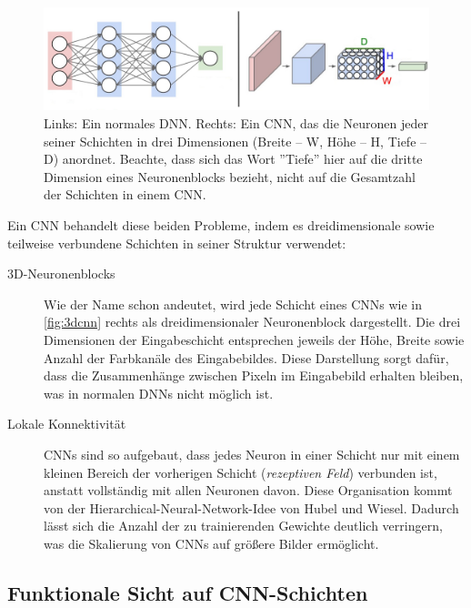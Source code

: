 \begin{figure}[!ht]
	\centering
	\includegraphics[width=\linewidth]{images/3DCNN}
	\caption{Links: Ein normales DNN. Rechts: Ein CNN, das die Neuronen jeder seiner Schichten in drei Dimensionen (Breite – W, Höhe – H, Tiefe – D) anordnet. Beachte, dass sich das Wort ''Tiefe'' hier auf die dritte Dimension eines Neuronenblocks bezieht, nicht auf die Gesamtzahl der Schichten in einem CNN.  \protect\cite{CS231nCNNarchitecture}}
	\label{fig:3dcnn}
\end{figure}

Ein CNN behandelt diese beiden Probleme, indem es dreidimensionale sowie teilweise verbundene Schichten in seiner Struktur verwendet:

\begin{description}
	\item[3D-Neuronenblocks]
	
	Wie der Name schon andeutet, wird jede Schicht eines CNNs wie in \autoref{fig:3dcnn} rechts als dreidimensionaler Neuronenblock dargestellt. Die drei Dimensionen der Eingabeschicht entsprechen jeweils der Höhe, Breite sowie Anzahl der Farbkanäle des Eingabebildes. Diese Darstellung sorgt dafür, dass die Zusammenhänge zwischen Pixeln im Eingabebild erhalten bleiben, was in normalen DNNs nicht möglich ist.

	\item[Lokale Konnektivität]
	
	CNNs sind so aufgebaut, dass jedes Neuron in einer Schicht nur mit einem kleinen Bereich der vorherigen Schicht (\emph{rezeptiven Feld}) verbunden ist, anstatt vollständig mit allen Neuronen davon. Diese Organisation kommt von der Hierarchical-Neural-Network-Idee von Hubel und Wiesel. Dadurch lässt sich die Anzahl der zu trainierenden Gewichte deutlich verringern, was die Skalierung von CNNs auf größere Bilder ermöglicht.
	
\end{description}

\subsection{Funktionale Sicht auf CNN-Schichten} \label{sec:CNN-Funktionale_Schichten}

